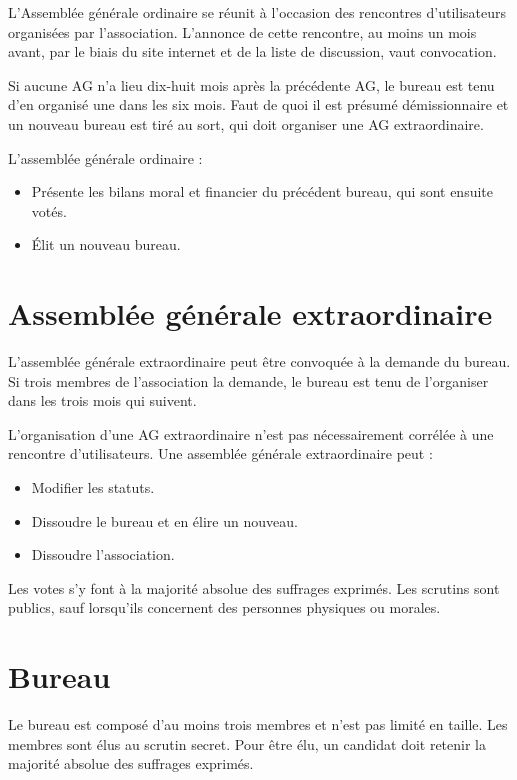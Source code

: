 \documentclass[11pt]{article}
\begin{document}
L'Assemblée générale ordinaire se réunit à l'occasion des rencontres d'utilisateurs organisées par l'association. 
L'annonce de cette rencontre, au moins un mois avant, par le biais du site internet et de la liste de discussion, vaut convocation.

Si aucune AG n'a lieu dix-huit mois après la précédente AG, le bureau est tenu d'en organisé une dans les six mois.
Faut de quoi il est présumé démissionnaire et un nouveau bureau est tiré au sort, qui doit organiser une AG extraordinaire.

L'assemblée générale ordinaire :
\begin{itemize}
	\item Présente les bilans moral et financier du précédent bureau, qui sont ensuite votés.
	\item Élit un nouveau bureau.
\end{itemize}

\section{Assemblée générale extraordinaire}

L'assemblée générale extraordinaire peut être convoquée à la demande du bureau. Si trois membres de l'association la demande, le bureau est tenu de l'organiser dans les trois mois qui suivent.

L'organisation d'une AG extraordinaire n'est pas nécessairement corrélée à une rencontre d'utilisateurs. 
Une assemblée générale extraordinaire peut :
\begin{itemize}
	\item Modifier les statuts.
	\item Dissoudre le bureau et en élire un nouveau.
	\item Dissoudre l'association.
\end{itemize}

Les votes s'y font à la majorité absolue des suffrages exprimés. Les scrutins sont publics, sauf lorsqu'ils concernent des personnes physiques ou morales.


\section{Bureau}

Le bureau est composé d'au moins trois membres et n'est pas limité en taille. Les membres sont élus au scrutin secret. Pour être élu, un candidat doit retenir la majorité absolue des suffrages exprimés.
\end{document}
